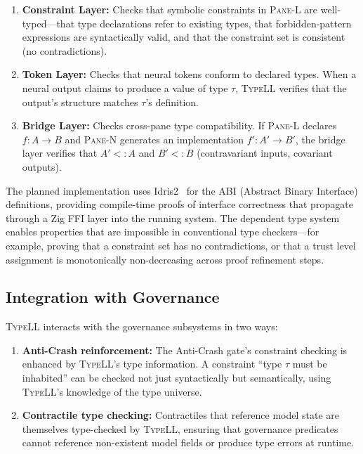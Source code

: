 \documentclass[11pt,a4paper]{article}
\newcommand{\paneL}{\textsc{Pane-L}}
\newcommand{\paneN}{\textsc{Pane-N}}
\newcommand{\typell}{\textsc{TypeLL}}
\begin{document}
\begin{enumerate}
  \item \textbf{Constraint Layer:} Checks that symbolic constraints
    in \paneL{} are well-typed---that type declarations refer to
    existing types, that forbidden-pattern expressions are syntactically
    valid, and that the constraint set is consistent (no contradictions).
  \item \textbf{Token Layer:} Checks that neural tokens conform to
    declared types. When a neural output claims to produce a value of
    type $\tau$, \typell{} verifies that the output's structure matches
    $\tau$'s definition.
  \item \textbf{Bridge Layer:} Checks cross-pane type compatibility.
    If \paneL{} declares $f : A \to B$ and \paneN{} generates an
    implementation $f' : A' \to B'$, the bridge layer verifies that
    $A' <: A$ and $B' <: B$ (contravariant inputs, covariant outputs).
\end{enumerate}

The planned implementation uses Idris2~\citep{brady2021idris2} for
the ABI (Abstract Binary Interface) definitions, providing
compile-time proofs of interface correctness that propagate through
a Zig FFI layer into the running system. The dependent type system
enables properties that are impossible in conventional type
checkers---for example, proving that a constraint set has no
contradictions, or that a trust level assignment is monotonically
non-decreasing across proof refinement steps.

\subsection{Integration with Governance}

\typell{} interacts with the governance subsystems in two ways:

\begin{enumerate}
  \item \textbf{Anti-Crash reinforcement:} The Anti-Crash gate's
    constraint checking is enhanced by \typell{}'s type information.
    A constraint ``type $\tau$ must be inhabited'' can be checked
    not just syntactically but semantically, using \typell{}'s
    knowledge of the type universe.
  \item \textbf{Contractile type checking:} Contractiles that
    reference model state are themselves type-checked by \typell{},
    ensuring that governance predicates cannot reference non-existent
    model fields or produce type errors at runtime.
\end{enumerate}
\end{document}
